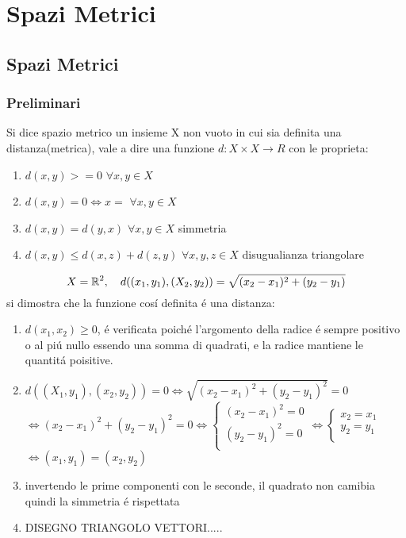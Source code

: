 \part{Spazi Metrici}
\chapter{Spazi Metrici}

\section{Preliminari}
Si dice spazio metrico un insieme X non vuoto in cui sia definita una
distanza(metrica), vale a dire una funzione $d: X \times X \rightarrow R$ con le proprieta:
\begin{enumerate}
	\item $d(x,y)>=0$ $\forall x,y \in X$
	\item $d(x,y)=0\Leftrightarrow x=$ $\forall x,y \in X$
	\item $d(x,y)=d(y,x)$ $\forall x,y \in X$ simmetria
	\item $d(x,y)\le d(x,z)+d(z,y)$ $\forall x,y,z\in X$ disugualianza triangolare 
\end{enumerate}

\example
$$X=\mathbb{R}^{2},\quad d((x_1,y_1),(X_2,y_2))=\sqrt{(x_2-x_1)^2+(y_2-y_1)}$$
si dimostra che la funzione cos\'i definita \'e una distanza:
\begin{enumerate}
	\item $d(x_1,x_2)\ge 0$, \'e verificata poich\'e l'argomento della radice \'e sempre positivo o al pi\'u nullo essendo una somma di quadrati, e la radice mantiene le quantit\'a poisitive.
	\item $d((X_1,y_1),(x_2,y_2))=0\Leftrightarrow \sqrt{(x_2-x_1)^2+(y_2-y_1)^2}=0$\\
	$\Leftrightarrow (x_2-x_1)^2+(y_2-y_1)^2=0 \Leftrightarrow 
	\left\{\begin{matrix}
	(x_2-x_1)^2=0\\
	(y_2-y_1)^2=0\\
	\end{matrix}\right.\Leftrightarrow
	\left\{\begin{matrix}
	x_2=x_1\\
	y_2=y_1\\
	\end{matrix}\right.$\\
	$\Leftrightarrow (x_1,y_1)=(x_2,y_2)$
	\item invertendo le prime componenti con le seconde, il quadrato non camibia quindi la simmetria \'e rispettata
	\item 
	DISEGNO TRIANGOLO VETTORI.....
\end{enumerate}

